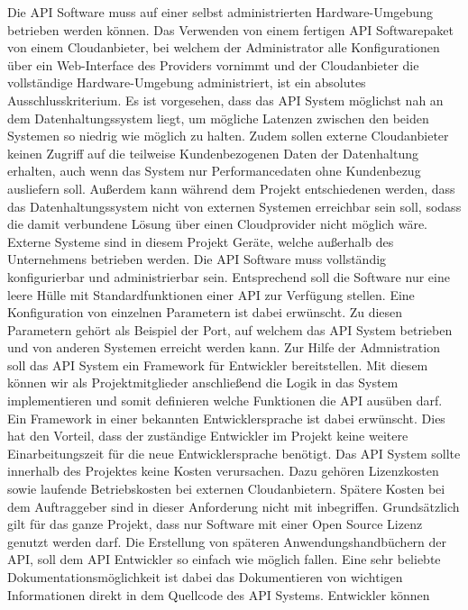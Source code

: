 \begin{outline}
  \1 Die API Software muss auf einer selbst administrierten Hardware-Umgebung
  betrieben werden können. Das Verwenden von einem fertigen API Softwarepaket
  von einem Cloudanbieter, bei welchem der Administrator alle Konfigurationen
  über ein Web-Interface des Providers vornimmt und der Cloudanbieter die
  vollständige Hardware-Umgebung administriert, ist ein absolutes
  Ausschlusskriterium. Es ist vorgesehen, dass das API System möglichst nah an
  dem Datenhaltungssystem liegt, um mögliche Latenzen zwischen den beiden
  Systemen so niedrig wie möglich zu halten. Zudem sollen externe Cloudanbieter
  keinen Zugriff auf die teilweise Kundenbezogenen Daten der Datenhaltung
  erhalten, auch wenn das System nur Performancedaten ohne Kundenbezug
  ausliefern soll. Außerdem kann während dem Projekt entschiedenen werden, dass
  das Datenhaltungssystem nicht von externen Systemen erreichbar sein soll,
  sodass die damit verbundene Lösung über einen Cloudprovider nicht möglich
  wäre. Externe Systeme sind in diesem Projekt Geräte, welche außerhalb des
  Unternehmens betrieben werden.
  \1 Die API Software muss vollständig konfigurierbar und administrierbar sein.
  Entsprechend soll die Software nur eine leere Hülle mit Standardfunktionen
  einer API zur Verfügung stellen. Eine Konfiguration von einzelnen Parametern
  ist dabei erwünscht. Zu diesen Parametern gehört als Beispiel der Port, auf
  welchem das API System betrieben und von anderen Systemen erreicht werden
  kann. Zur Hilfe der Admnistration soll das API System ein Framework für
  Entwickler bereitstellen. Mit diesem können wir als Projektmitglieder
  anschließend die Logik in das System implementieren und somit definieren
  welche Funktionen die API ausüben darf. Ein Framework in einer bekannten
  Entwicklersprache ist dabei erwünscht. Dies hat den Vorteil, dass der
  zuständige Entwickler im Projekt keine weitere Einarbeitungszeit für die neue
  Entwicklersprache benötigt.
  \1 Das API System sollte innerhalb des Projektes keine Kosten verursachen.
  Dazu gehören Lizenzkosten sowie laufende Betriebskosten bei externen
  Cloudanbietern. Spätere Kosten bei dem Auftraggeber sind in dieser
  Anforderung nicht mit inbegriffen. Grundsätzlich gilt für das ganze Projekt,
  dass nur Software mit einer Open Source Lizenz genutzt werden darf.
  \1 Die Erstellung von späteren Anwendungshandbüchern der API, soll dem API
  Entwickler so einfach wie möglich fallen. Eine sehr beliebte
  Dokumentationsmöglichkeit ist dabei das Dokumentieren von wichtigen
  Informationen direkt in dem Quellcode des API Systems. Entwickler können

\end{outline}

